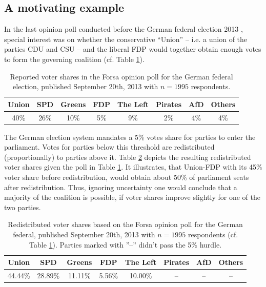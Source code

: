 \documentclass[smallcondensed]{svjour3}     %
\begin{document}
\subsection{A motivating example}\label{ssec:intro-ex-fdp}
In the last opinion poll conducted before the German federal election 2013 \citep{forsa_2013},
special interest was on whether the conservative ``Union'' -- i.e. a union of
the parties CDU and CSU -- and the liberal FDP would together obtain enough votes
to form the governing coalition (cf. Table \ref{tab_fdp}).

\begin{table}[!ht]\centering
\caption{Reported voter shares in the Forsa opinion poll for the German federal election, published September 20th, 2013 with $n=1995$ respondents.
\label{tab_fdp}
}
\medskip
\begin{tabular}{cccccccc}
\toprule[0.09 em]
Union & SPD & Greens & FDP & The Left & Pirates & AfD & Others \\
\midrule
40\% & 26\% & 10\% & 5\% & 9\% & 2\% & 4\% & 4\% \\
\bottomrule[0.09 em]
\end{tabular}
\end{table}

The German election system mandates a 5\% votes share for parties to enter the parliament.
Votes for parties below this threshold are redistributed (proportionally) to parties
above it. Table \ref{tab_fdp_redist} depicts the resulting redistributed voter
shares given the poll in Table \ref{tab_fdp}. It illustrates, that Union-FDP with
its 45\% voter share before redistribution, would obtain about 50\% of parliament
seats after redistribution. Thus, ignoring uncertainty one would conclude that a
majority of the coalition is possible, if voter shares improve slightly for one
of the two parties.

\begin{table}[!ht]\centering
\caption{Redistributed voter shares based on the Forsa opinion poll for the German federal, published September 20th, 2013 with $n=1995$ respondents (cf. Table \ref{tab_fdp}). Parties marked with ''--''
didn't pass the 5\% hurdle.
\label{tab_fdp_redist}
}
\medskip
\begin{tabular}{cccccccc}
\toprule[0.09 em]
Union & SPD & Greens & FDP & The Left & Pirates & AfD & Others \\
\midrule
44.44\% & 28.89\% & 11.11\% & 5.56\% & 10.00\% & -- & -- & -- \\
\bottomrule[0.09 em]
\end{tabular}
\end{table}
\end{document}
